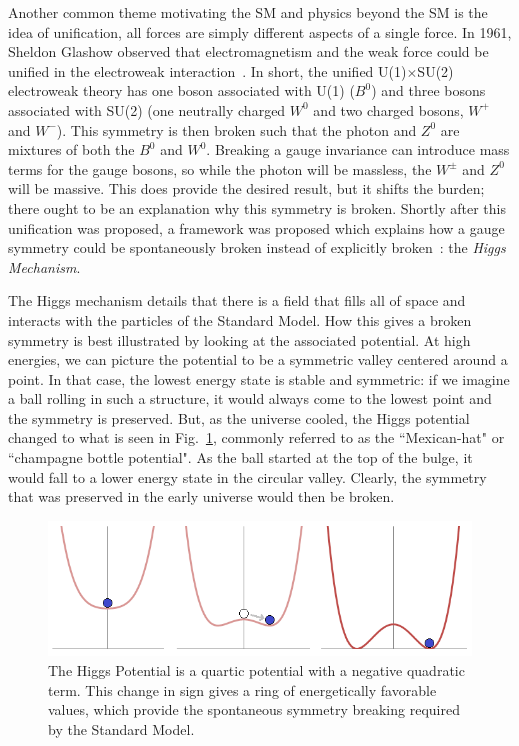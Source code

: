 Another common theme motivating the SM and physics beyond the SM is the idea of unification, all forces are simply different aspects of a single force. In 1961, Sheldon Glashow observed that electromagnetism and the weak force could be unified in the electroweak interaction~\cite{Glashow:1961}. In short, the unified U(1)$\times$SU(2) electroweak theory has one boson associated with U(1) ($B^{0}$) and three bosons associated with SU(2) (one neutrally charged $W^{0}$ and two charged bosons, $W^{+}$ and $W^{-}$). This symmetry is then broken such that the photon and $Z^{0}$ are mixtures of both the $B^{0}$ and $W^{0}$. Breaking a gauge invariance can introduce mass terms for the gauge bosons, so while the photon will be massless, the $W^{\pm}$ and $Z^{0}$ will be massive. This does provide the desired result, but it shifts the burden; there ought to be an explanation why this symmetry is broken. Shortly after this unification was proposed, a framework was proposed which explains how a gauge symmetry could be spontaneously broken instead of explicitly broken~\cite{Anderson:1963pc,Higgs:1964,Englert:1964,Higgs:1964-2,Guralnik:1964}: the \textit{Higgs Mechanism}. 

The Higgs mechanism details that there is a field that fills all of space and interacts with the particles of the Standard Model. How this gives a broken symmetry is best illustrated by looking at the associated potential. At high energies, we can picture the potential to be a symmetric valley centered around a point. In that case, the lowest energy state is stable and symmetric: if we imagine a ball rolling in such a structure, it would always come to the lowest point and the symmetry is preserved. But, as the universe cooled, the Higgs potential changed to what is seen in Fig.~\ref{fig:HiggsPotential}, commonly referred to as the ``Mexican-hat" or ``champagne bottle potential". As the ball started at the top of the bulge, it would fall to a lower energy state in the circular valley. Clearly, the symmetry that was preserved in the early universe would then be broken.

\begin{figure}[hbt]
\begin{center}
\includegraphics[width=.7\linewidth]{Introduction/figures/SpontaneousSymmetryBreaking.png}
\caption[The Higgs Mechanism - FROM WIKIPEDIA]{The Higgs Potential is a quartic potential with a negative quadratic term. This change in sign gives a ring of energetically favorable values, which provide the spontaneous symmetry breaking required by the Standard Model.}
\label{fig:HiggsPotential}
\end{center}
\end{figure}

